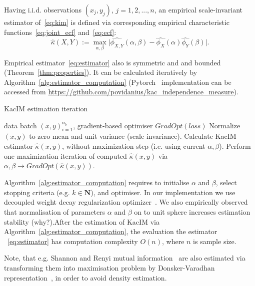 \documentclass{article}
\begin{document}
Having i.i.d. observations $(x_{j}, y_{j})$, $j = 1,2,...,n$, an empirical scale-invariant estimator of~\eqref{eq:kim} is defined via corresponding empirical characteristic functions~\eqref{eq:joint_ecf} and~\eqref{eq:ecf}:
\begin{equation}
\label{eq:estimator}
    \hat{\kappa}(X,Y) := \max_{\alpha, \beta} \vert \widehat{\phi_{X,Y}}(\alpha,\beta)  - \widehat{\phi_{X}}(\alpha) \widehat{\phi_{Y}}(\beta) \vert.
\end{equation}

\noindent Empirical estimator~\eqref{eq:estimator} also is symmetric and and bounded (Theorem~\ref{thm:properties}). It can be calculated iteratively by Algorithm~\ref{alg:estimator_computation} (Pytorch~\cite{NEURIPS2019_9015} implementation can be accessed from \url{https://github.com/povidanius/kac_independence_measure}). 


\begin{algorithm}
\caption{KacIM estimation iteration}\label{alg:estimator_computation}
\begin{algorithmic}
\Require data batch $(x,y)_{i=1}^{n_{b}}$, gradient-based optimiser $GradOpt(loss)$
\State Normalize $(x,y)$ to zero mean and unit variance (scale invariance).
\State Calculate KacIM estimator $\hat{\kappa}(x,y)$, without maximization step (i.e. using current $\alpha, \beta$).
\State Perform one maximization iteration of computed $\hat{\kappa}(x,y)$ via $\alpha, \beta \rightarrow GradOpt(\hat{\kappa}(x,y))$.
\end{algorithmic}
\end{algorithm}




Algorithm~\ref{alg:estimator_computation} requires to initialise $\alpha$ and $\beta$, select stopping criteria (e.g. $k \in \mathbf{N}$), and optimiser. In our implementation we use decoupled weight decay regularization optimizer~\cite{Loshchilov2019DecoupledWD}. 
We also empirically observed that normalisation of parameters $\alpha$ and $\beta$ on to unit sphere increases estimation stability (why?).After the estimation of KacIM via Algorithm~\ref{alg:estimator_computation}, the evaluation the estimator ~\eqref{eq:estimator} has computation complexity $O(n)$, where $n$ is sample size.

Note, that e.g. Shannon and Renyi mutual information~\cite{Cover2006} are also estimated via transforming them into maximisation problem by Donsker-Varadhan representation~\cite{pmlr-v80-belghazi18a}, in order to avoid density estimation.
\end{document}
